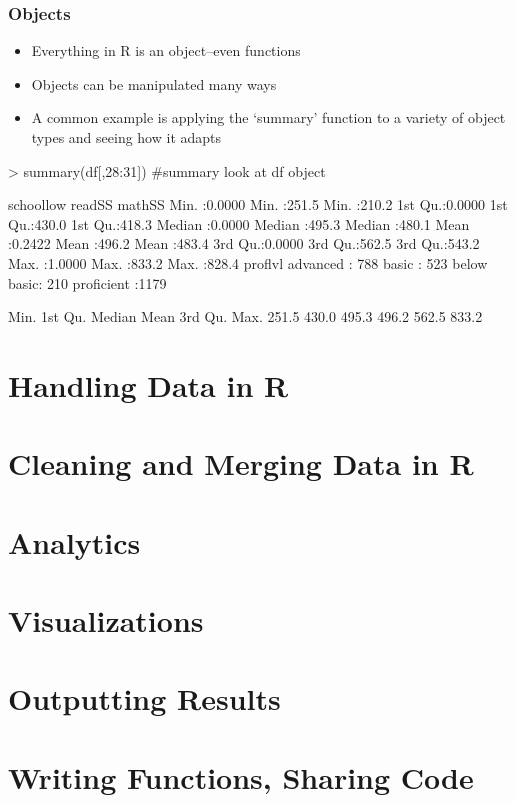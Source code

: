 \documentclass{beamer}
\begin{document}
\begin{frame}[containsverbatim]
\frametitle{Objects}
\begin{itemize}
  \item Everything in R is an object--even functions
  \item Objects can be manipulated many ways
  \item A common example is applying the `summary' function to a variety of object types and seeing how it adapts
\end{itemize}
\begin{Schunk}
\begin{Sinput}
> summary(df[,28:31]) #summary look at df object
\end{Sinput}
\begin{Soutput}
   schoollow          readSS          mathSS     
 Min.   :0.0000   Min.   :251.5   Min.   :210.2  
 1st Qu.:0.0000   1st Qu.:430.0   1st Qu.:418.3  
 Median :0.0000   Median :495.3   Median :480.1  
 Mean   :0.2422   Mean   :496.2   Mean   :483.4  
 3rd Qu.:0.0000   3rd Qu.:562.5   3rd Qu.:543.2  
 Max.   :1.0000   Max.   :833.2   Max.   :828.4  
        proflvl    
 advanced   : 788  
 basic      : 523  
 below basic: 210  
 proficient :1179  
\end{Soutput}
\begin{Soutput}
   Min. 1st Qu.  Median    Mean 3rd Qu.    Max. 
  251.5   430.0   495.3   496.2   562.5   833.2 
\end{Soutput}
\end{Schunk}
\end{frame}


\section{Handling Data in R}

\section{Cleaning and Merging Data in R}

\section{Analytics}

\section{Visualizations}

\section{Outputting Results}

\section{Writing Functions, Sharing Code}
\end{document}
